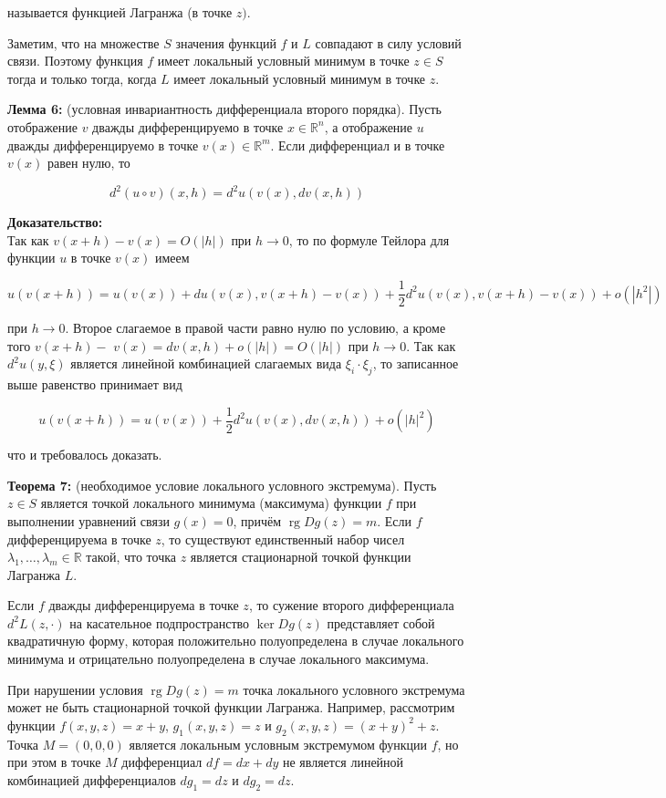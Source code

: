 \documentclass[a4paper,12pt]{article} %
\begin{document}
называется функцией Лагранжа (в точке $z)$.

Заметим, что на множестве $S$ значения функций $f$ и $L$ совпадают в силу условий связи. Поэтому функция $f$ имеет локальный условный минимум в точке $z \in S$ тогда и только тогда, когда $L$ имеет локальный условный минимум в точке $z$.

\textbf{Лемма 6:} (условная инвариантность дифференциала второго порядка). Пусть отображение $v$ дважды дифференцируемо в точке $x \in \mathbb{R}^{n}$, а отображение $u$ дважды дифференцируемо в точке $v(x) \in \mathbb{R}^{m}$. Если дифференциал $и$ в точке $v(x)$ равен нулю, то

$$
d^{2}(u \circ v)(x, h)=d^{2} u(v(x), d v(x, h))
$$

\textbf{Доказательство:}\\
Так как $v(x+h)-v(x)=O(|h|)$ при $h \rightarrow 0$, то по формуле Тейлора для функции $u$ в точке $v(x)$ имеем

$$
u(v(x+h))=u(v(x))+d u(v(x), v(x+h)-v(x))+\frac{1}{2} d^{2} u(v(x), v(x+h)-v(x))+o\left(\left|h^{2}\right|\right)
$$

при $h \rightarrow 0$. Второе слагаемое в правой части равно нулю по условию, а кроме того $v(x+h)-$ $v(x)=d v(x, h)+o(|h|)=O(|h|)$ при $h \rightarrow 0$. Так как $d^{2} u(y, \xi)$ является линейной комбинацией слагаемых вида $\xi_{i} \cdot \xi_{j}$, то записанное выше равенство принимает вид

$$
u(v(x+h))=u(v(x))+\frac{1}{2} d^{2} u(v(x), d v(x, h))+o\left(|h|^{2}\right)
$$

что и требовалось доказать.

\textbf{Теорема 7:} (необходимое условие локального условного экстремума). Пусть $z \in S$ является точкой локального минимума (максимума) функции $f$ при выполнении уравнений связи $g(x)=0$, причём $\operatorname{rg} D g(z)=m$. Если $f$ дифференцируема в точке $z$, то существуют единственный набор чисел $\lambda_{1}, \ldots, \lambda_{m} \in \mathbb{R}$ такой, что точка $z$ является стационарной точкой функции Лагранжа $L$.

Если $f$ дважды дифференцируема в точке $z$, то сужение второго дифференциала $d^{2} L(z, \cdot)$ на касательное подпространство $\operatorname{ker} D g(z)$ представляет собой квадратичную форму, которая положительно полуопределена в случае локального минимума и отрицательно полуопределена в случае локального максимума.

При нарушении условия $\operatorname{rg} D g(z)=m$ точка локального условного экстремума может не быть стационарной точкой функции Лагранжа. Например, рассмотрим функции $f(x, y, z)=x+y$, $g_{1}(x, y, z)=z$ и $g_{2}(x, y, z)=(x+y)^{2}+z$. Точка $M=(0,0,0)$ является локальным условным экстремумом функции $f$, но при этом в точке $M$ дифференциал $d f=d x+d y$ не является линейной комбинацией дифференциалов $d g_{1}=d z$ и $d g_{2}=d z$.
\end{document}
